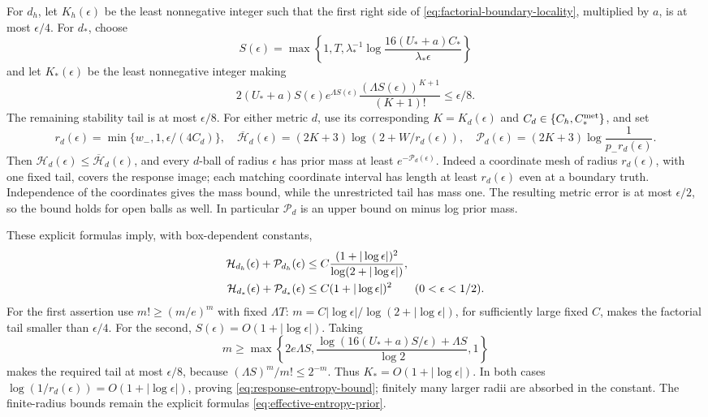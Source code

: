 For \(d_h\), let \(K_h(\epsilon)\) be the least nonnegative integer such
that the first right side of \eqref{eq:factorial-boundary-locality},
multiplied by \(a\), is at most \(\epsilon/4\).
For \(d_*\), choose
\[
 S(\epsilon)=\max\left\{1,T,
 \lambda_*^{-1}\log\frac{16(U_*+a)C_*}{\lambda_*\epsilon}\right\}
\]
and let \(K_*(\epsilon)\) be the least nonnegative integer making
\[
 2(U_*+a)S(\epsilon)e^{\Lambda S(\epsilon)}
 \frac{(\Lambda S(\epsilon))^{K+1}}{(K+1)!}\le\epsilon/8.
\]
The remaining stability tail is at most \(\epsilon/8\).
For either metric \(d\), use its corresponding \(K=K_d(\epsilon)\)
and \(C_d\in\{C_h,C_*^{\rm met}\}\), and set
\begin{equation}
 r_d(\epsilon)=\min\{w_-,1,\epsilon/(4C_d)\},\quad
 \overline{\mathcal H}_d(\epsilon)=(2K+3)
       \log(2+W/r_d(\epsilon)),\quad
 \mathcal P_d(\epsilon)=(2K+3)\log\frac1{p_-r_d(\epsilon)}.
 \label{eq:effective-entropy-prior}
\end{equation}
Then \(\mathcal H_d(\epsilon)\le\overline{\mathcal H}_d(\epsilon)\),
and every \(d\)-ball of radius \(\epsilon\) has prior mass at least
\(e^{-\mathcal P_d(\epsilon)}\). Indeed a coordinate mesh of radius
\(r_d(\epsilon)\), with one fixed tail, covers the response image;
each matching coordinate interval has length at least \(r_d(\epsilon)\)
even at a boundary truth. Independence of the coordinates gives the mass
bound, while the unrestricted tail has mass one. The resulting metric error
is at most \(\epsilon/2\), so the bound holds for open balls as well.
In particular \(\mathcal P_d\) is an upper bound on minus log prior mass.

These explicit formulas imply, with box-dependent constants,
\begin{align}
 \mathcal H_{d_h}(\epsilon)+\mathcal P_{d_h}(\epsilon)
 &\le C\frac{(1+|\log\epsilon|)^2}
                   {\log(2+|\log\epsilon|)},\notag\\
 \mathcal H_{d_*}(\epsilon)+\mathcal P_{d_*}(\epsilon)
 &\le C(1+|\log\epsilon|)^2\qquad(0<\epsilon<1/2).
 \label{eq:response-entropy-bound}
\end{align}
For the first assertion use \(m!\ge(m/e)^m\) with fixed \(\Lambda T\):
\(m=C|\log\epsilon|/\log(2+|\log\epsilon|)\), for sufficiently large
fixed \(C\), makes the factorial tail smaller than \(\epsilon/4\).
For the second, \(S(\epsilon)=O(1+|\log\epsilon|)\). Taking
\[
 m\ge\max\left\{2e\Lambda S,
 \frac{\log(16(U_*+a)S/\epsilon)+\Lambda S}{\log2},1\right\}
\]
makes the required tail at most \(\epsilon/8\), because
\((\Lambda S)^m/m!\le2^{-m}\). Thus \(K_*=O(1+|\log\epsilon|)\).
In both cases \(\log(1/r_d(\epsilon))=O(1+|\log\epsilon|)\), proving
\eqref{eq:response-entropy-bound}; finitely many larger radii are absorbed
in the constant. The finite-radius bounds remain the explicit formulas
\eqref{eq:effective-entropy-prior}.

